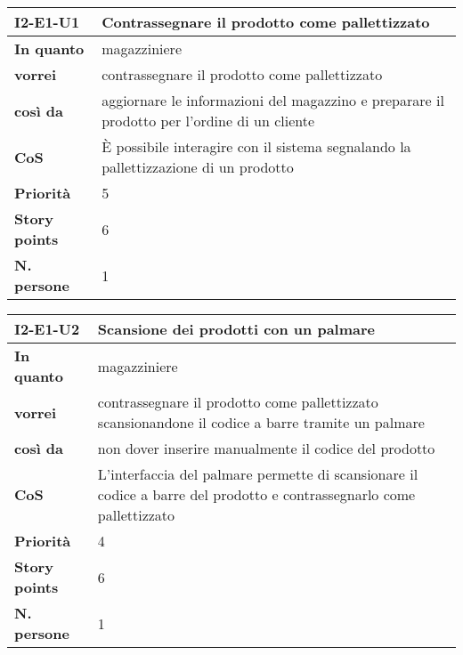\begin{table}[H]
  \begin{tabularx}{\textwidth}{lX}
    \toprule
    \textbf{I2-E1-U1} & \textbf{Contrassegnare il prodotto come pallettizzato} \\
    \midrule
    \textbf{In quanto} & magazziniere \\
    \textbf{vorrei} & contrassegnare il prodotto come pallettizzato \\
    \textbf{così da} & aggiornare le informazioni del magazzino e preparare il prodotto per l'ordine di un cliente \\
    \midrule
    \textbf{CoS} & È possibile interagire con il sistema segnalando la pallettizzazione di un prodotto \\
    \midrule
    \textbf{Priorità} & 5 \\
    \textbf{Story points} & 6 \\
    \textbf{N. persone} & 1 \\
    \bottomrule
  \end{tabularx}
  \label{user-story:i2-e1-u1}
\end{table}

\begin{table}[H]
  \begin{tabularx}{\textwidth}{lX}
    \toprule
    \textbf{I2-E1-U2} & \textbf{Scansione dei prodotti con un palmare} \\
    \midrule
    \textbf{In quanto} & magazziniere \\
    \textbf{vorrei} & contrassegnare il prodotto come pallettizzato scansionandone il codice a barre tramite un palmare \\
    \textbf{così da} & non dover inserire manualmente il codice del prodotto \\
    \midrule
    \textbf{CoS} & L'interfaccia del palmare permette di scansionare il codice a barre del prodotto e contrassegnarlo come pallettizzato \\
    \midrule
    \textbf{Priorità} & 4 \\
    \textbf{Story points} & 6 \\
    \textbf{N. persone} & 1 \\
    \bottomrule
  \end{tabularx}
  \label{user-story:i2-e1-u2}
\end{table}

